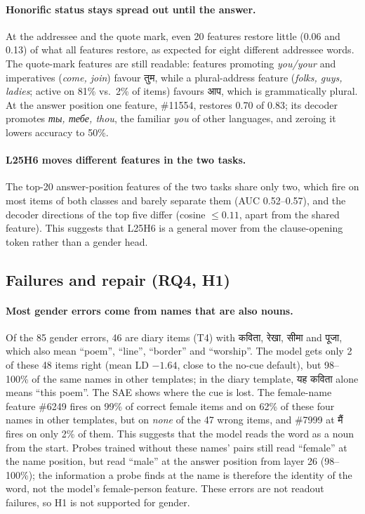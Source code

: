 \documentclass[11pt]{article}
\newcommand{\hi}[1]{{\devfont #1}}
\newcommand{\main}{\hi{मैं}}  %
\newcommand{\aap}{\hi{आप}}
\newcommand{\tum}{\hi{तुम}}
\begin{document}
\paragraph{Honorific status stays spread out until the answer.} At the addressee and the quote mark, even 20 features restore little (0.06 and 0.13) of what all features restore, as expected for eight different addressee words. The quote-mark features are still readable: features promoting \emph{you/your} and imperatives (\emph{come, join}) favour \tum{}, while a plural-address feature (\emph{folks, guys, ladies}; active on 81\% vs.\ 2\% of items) favours \aap{}, which is grammatically plural. At the answer position one feature, \#11554, restores 0.70 of 0.83; its decoder promotes \emph{ты, тебе, thou}, the familiar \emph{you} of other languages, and zeroing it lowers accuracy to 50\%.

\paragraph{L25H6 moves different features in the two tasks.} The top-20 answer-position features of the two tasks share only two, which fire on most items of both classes and barely separate them (AUC 0.52--0.57), and the decoder directions of the top five differ (cosine $\le0.11$, apart from the shared feature). This suggests that L25H6 is a general mover from the clause-opening token rather than a gender head.

\subsection{Failures and repair (RQ4, H1)}
\label{sec:failures}

\paragraph{Most gender errors come from names that are also nouns.} Of the 85 gender errors, 46 are diary items (T4) with \hi{कविता}, \hi{रेखा}, \hi{सीमा} and \hi{पूजा}, which also mean ``poem'', ``line'', ``border'' and ``worship''. The model gets only 2 of these 48 items right (mean LD $-1.64$, close to the no-cue default), but 98--100\% of the same names in other templates; in the diary template, \hi{यह कविता} alone means ``this poem''. The SAE shows where the cue is lost. The female-name feature \#6249 fires on 99\% of correct female items and on 62\% of these four names in other templates, but on \emph{none} of the 47 wrong items, and \#7999 at \main{} fires on only 2\% of them. This suggests that the model reads the word as a noun from the start. Probes trained without these names' pairs still read ``female'' at the name position, but read ``male'' at the answer position from layer 26 (98--100\%); the information a probe finds at the name is therefore the identity of the word, not the model's female-person feature. These errors are not readout failures, so H1 is not supported for gender.
\end{document}

